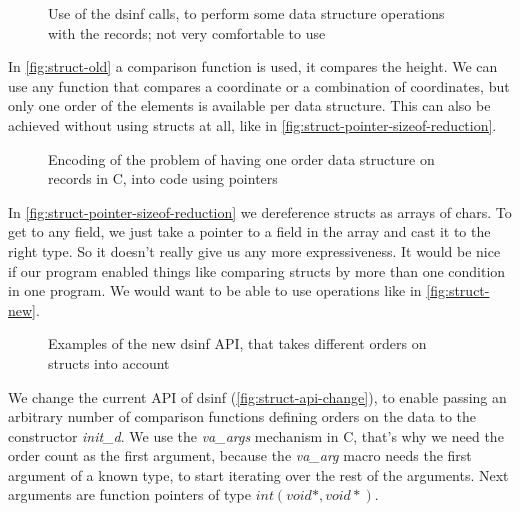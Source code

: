 \documentclass[a4paper,11pt]{article}
\begin{document}
            \begin{figure}[h!]
				

				\caption{Use of the dsinf calls, to perform some data structure operations with the
				records; not very comfortable to use}

				\label{fig:struct-old}
			\end{figure}

			In \autoref{fig:struct-old} a comparison function is used, it compares the height. We can use
			any function that compares a coordinate or a combination of coordinates, but only one order of
			the elements is available per data structure. This can also be achieved without using structs at
			all, like in \autoref{fig:struct-pointer-sizeof-reduction}.

            \begin{figure}[h!]
				

				\caption{Encoding of the problem of having one order data structure on records in C,
				into code using pointers}

				\label{fig:struct-pointer-sizeof-reduction}
			\end{figure}

			In \autoref{fig:struct-pointer-sizeof-reduction} we dereference structs as arrays of
			chars. To get to any field, we just take a pointer to a field in the array and cast it to the
			right type. So it doesn't really give us any more expressiveness. It would be nice if our
			program enabled things like comparing structs by more than one condition in one program. We
			would want to be able to use operations like in \autoref{fig:struct-new}.

            \begin{figure}[h!]
				

				\caption{Examples of the new dsinf API, that takes different orders on structs into
				account}

				\label{fig:struct-new}
			\end{figure}

            We change the current API of dsinf (\autoref{fig:struct-api-change}), to enable passing an arbitrary number
            of comparison functions defining orders on the data to the constructor \emph{init\_d}. We use the \emph{va\_args}
            mechanism in C, that's why we need the order count as the first argument, because the \emph{va\_arg} macro needs
            the first argument of a known type, to start iterating over the rest of the arguments. Next arguments are
            function pointers of type $int(void *, void *)$.
\end{document}
